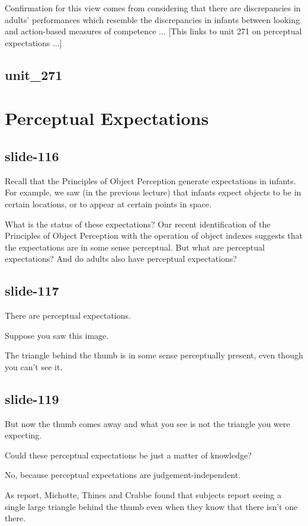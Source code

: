 \documentclass[12pt,\papersize]{extarticle}
\begin{document}
Confirmation for this view comes from considering that there are discrepancies in adults' 
performances which resemble the discrepancies in infants between looking and action-based 
measures of competence ...
[This links to unit 271 on perceptual expectations ...]
 
\subsection{unit\_271}
 
 
\section{Perceptual Expectations}
 
\subsection{slide-116}
Recall that the Principles of Object Perception generate expectations in infants.
For example, we saw (in the previous lecture) that infants expect objects to be in certain 
locations, or to appear at 
certain points in space.
 
What is the status of these expectations?
Our recent identification of the Principles of Object Perception with the operation of object
indexes suggests that the expectations are in some sense perceptual.
But what are perceptual expectations?
And do adults also have perceptual expectations?
 
\subsection{slide-117}
There are perceptual expectations.
 
Suppose you saw this image.
 
The triangle behind the thumb is in some sense perceptually present, even though you can't see it.
 
\subsection{slide-119}
But now the thumb comes away and what you see is not the triangle you were expecting.
 
Could these perceptual expectations be just a matter of knowledge?
 
No, because perceptual expectations are judgement-independent.
 
As \citep{kellman:1983_perception} report, Michotte, Thines and Crabbe found that subjects report seeing a single large triangle behind the thumb even when they know that there isn't one there.
 
\end{document}

